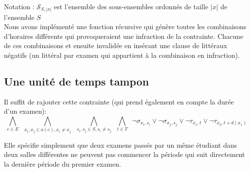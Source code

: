 \documentclass[a4paper]{article}
\begin{document}
  Notation : $\mathcal{S}_{S, |x|}$ est l'ensemble des sous-ensembles ordonnés de taille $|x|$ de l'ensemble $S$\\

  Nous avons implémenté une fonction récursive qui génère toutes les combinaisons d'horaires différents qui provoqueraient une infraction de la contrainte. Chacune de ces combinaisons et ensuite invalidée en insérant une clause de littéraux négatifs (un littéral par examen qui appartient à la combinaison en infraction).

\subsection{Une unité de temps tampon}
  Il suffit de rajouter cette contrainte (qui prend également en compte la durée d'un examen):
  $$  \bigwedge\limits_{e \in E} \,\,\,
      \bigwedge\limits_{x_i, x_j \in a(e), x_i \neq x_j} \,\,\,
      \bigwedge\limits_{s_i, s_j \in S, s_i \neq s_j} \,\,\,
      \bigwedge\limits_{t \in T} \,\,\,
      \lnot \sigma_{x_i, s_i} \lor \lnot \sigma_{x_j, s_j}
      \lor \lnot \tau_{x_1, t} \lor \lnot \tau_{x_2, t+d(x_1)} $$

  Elle spécifie simplement que deux examens passés par un même étudiant dans deux salles différentes ne peuvent pas commencer la période qui suit directement la dernière période du premier examen.
\end{document}
